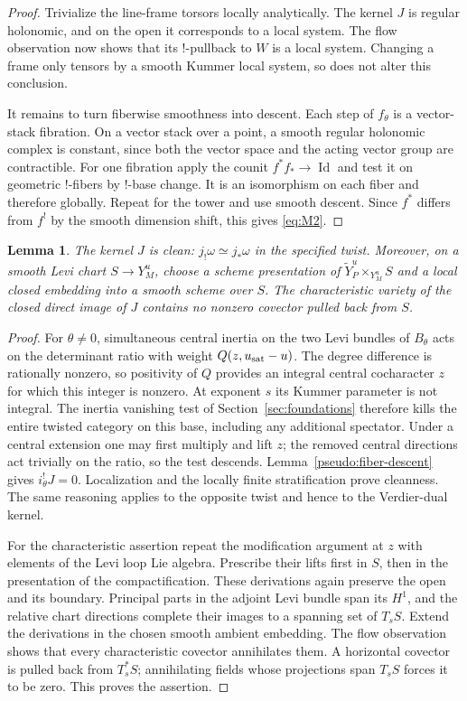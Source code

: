 \documentclass[11pt]{article}
\numberwithin{equation}{section}
\newtheorem{lemma}[theorem]{Lemma}
\theoremstyle{definition}
\theoremstyle{remark}
\begin{document}
\begin{proof}
Trivialize the line-frame torsors locally analytically.  The kernel $J$ is
regular holonomic, and on the open it corresponds to a local system.
The flow observation now shows that its !-pullback to $W$ is a local system.
Changing a frame only tensors by a smooth Kummer local system, so does not
alter this conclusion.

It remains to turn fiberwise smoothness into descent.  Each step of
$f_\theta$ is a vector-stack fibration.  On a vector stack over a point, a
smooth regular holonomic complex is constant, since both the vector space
and the acting vector group are contractible.  For one fibration apply the
counit $f^*f_*\to\operatorname{Id}$ and test it on geometric !-fibers by
!-base change.  It is an isomorphism on each fiber and therefore globally.
Repeat for the tower and use smooth descent.  Since $f^*$ differs from $f^!$
by the smooth dimension shift, this gives \eqref{eq:M2}.
\end{proof}

\begin{lemma}\label{pseudo:clean-noncharacteristic}
The kernel $J$ is clean: $j_!\omega\simeq j_*\omega$ in the specified twist.
Moreover, on a smooth Levi chart $S\to Y_M^u$, choose a scheme presentation
of $\widetilde Y_P^u\times_{Y_M^u}S$ and a local closed embedding into a
smooth scheme over $S$.  The characteristic variety of the closed direct
image of $J$ contains no nonzero covector pulled back from $S$.
\end{lemma}

\begin{proof}
For $\theta\ne0$, simultaneous central inertia on the two Levi bundles of
$B_\theta$ acts on the determinant ratio with weight
$Q(z,u_{\rm sat}-u)$.  The degree difference is rationally nonzero, so
positivity of $Q$ provides an integral central cocharacter $z$ for which
this integer is nonzero.  At exponent $s$ its Kummer parameter is not
integral.  The inertia vanishing test of Section~\ref{sec:foundations}
therefore kills the entire twisted category on this base, including any
additional spectator.  Under a central extension one may first multiply
and lift $z$; the removed central directions act trivially on the ratio,
so the test descends.  Lemma~\ref{pseudo:fiber-descent} gives
$i_\theta^!J=0$.  Localization and the locally finite stratification prove
cleanness.  The same reasoning applies to the opposite twist and hence to
the Verdier-dual kernel.

For the characteristic assertion repeat the modification argument at $z$
with elements of the Levi loop Lie algebra.  Prescribe their lifts first in
$S$, then in the presentation of the compactification.  These derivations
again preserve the open and its boundary.  Principal parts in the adjoint
Levi bundle span its $H^1$, and the relative chart directions complete their
images to a spanning set of $T_sS$.  Extend the derivations in the chosen
smooth ambient embedding.  The flow observation shows that every
characteristic covector annihilates them.  A horizontal covector is pulled
back from $T_s^*S$; annihilating fields whose projections span $T_sS$ forces
it to be zero.  This proves the assertion.
\end{proof}
\end{document}
